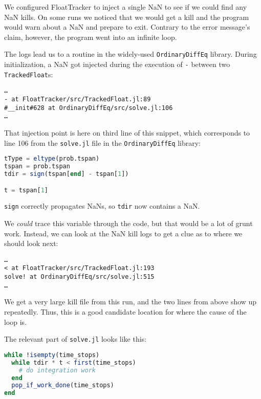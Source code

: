 \documentclass{juliacon}
\begin{document}
We configured FloatTracker to inject a single NaN to see if we could find any NaN kills.
On some runs we noticed that we would get a kill and the program would warn about a NaN and prepare to exit.
Contrary to the error message's claim, however, the program went into an infinite loop.

The logs lead us to a routine in the widely-used \texttt{OrdinaryDiffEq} library.
During initialization, a NaN got injected during the execution of \texttt{-} between two \texttt{TrackedFloat}s:

\begin{verbatim}
…
- at FloatTracker/src/TrackedFloat.jl:89
#__init#628 at OrdinaryDiffEq/src/solve.jl:106
…
\end{verbatim}

That injection point is here on third line of this snippet, which corresponds to line 106 from the \texttt{solve.jl} file in the \texttt{OrdinaryDiffEq} library:

\begin{lstlisting}[language = Julia]
tType = eltype(prob.tspan)
tspan = prob.tspan
tdir = sign(tspan[end] - tspan[1])

t = tspan[1]
\end{lstlisting}

\texttt{sign} correctly propagates NaNs, so \texttt{tdir} now contains a NaN.

We \emph{could} trace this variable through the code, but that would be a lot of grunt work.
Instead, we can look at the NaN kill logs to get a clue as to where we should look next:

\begin{verbatim}
…
< at FloatTracker/src/TrackedFloat.jl:193
solve! at OrdinaryDiffEq/src/solve.jl:515
…
\end{verbatim}

We get a very large kill file from this run, and the two lines from above show up repeatedly.
Thus, this is a good candidate location for where the cause of the loop is.

The relevant part of \texttt{solve.jl} looks like this:


\begin{lstlisting}[language = Julia]
while !isempty(time_stops)
  while tdir * t < first(time_stops)
    # do integration work
  end
  pop_if_work_done(time_stops)
end
\end{lstlisting}
\end{document}
